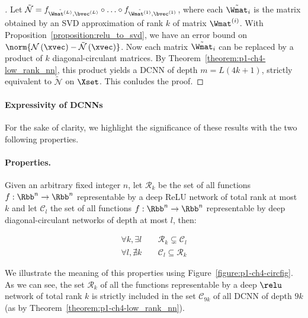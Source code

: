 \begin{proof}[]
  Let $\tilde{\mathcal{N}} = f_{\tilde{\Wmat^{(L)}},\bvec^{(L)}} \circ \ldots \circ f_{\tilde{\Wmat^{(1)}},\bvec^{(1)}}$, where each $\tilde{\Wmat}_{i}$ is the matrix obtained by an SVD approximation of rank $k$ of matrix $\Wmat^{(i)}$.
  With Proposition~\ref{proposition:relu_to_svd}, we have an error bound on $\norm{\mathcal{N} \left(\xvec\right) - \tilde{\mathcal{N}} \left(\xvec\right)}$.
  Now each matrix $\tilde{\Wmat}_{i}$ can be replaced by a product of $k$ diagonal-circulant matrices.
  By Theorem~\ref{theorem:p1-ch4-low_rank_nn}, this product yields a DCNN of depth $m = L(4k+1)$, strictly equivalent to $\tilde{\mathcal{N}}$ on $\Xset$.
  This conludes the proof.
\end{proof}



\paragraph{Expressivity of DCNNs}

For the sake of clarity, we highlight the significance of these results with the two following properties.

\paragraph{Properties.}
Given an arbitrary fixed integer $n$, let $\mathcal{R}_{k}$ be the set of all functions $f:\Rbb^{n} \rightarrow \Rbb^{n}$ representable by a deep ReLU network of total rank at most $k$ and let $\mathcal{C}_{l}$ the set of all functions $f:\Rbb^{n} \rightarrow \Rbb^{n}$ representable by deep diagonal-circulant networks of depth at most $l$, then:

\begin{align}
  \label{property:eq1} \forall k,\exists l \, &\quad \mathcal{R}_{k} \subsetneq \mathcal{C}_{l} \\
  \label{property:eq2} \forall l,\nexists k\, &\quad \mathcal{C}_{l} \subseteq \mathcal{R}_{k}
\end{align}

We illustrate the meaning of this properties using Figure~\ref{figure:p1-ch4-circfig}.
As we can see, the set $\mathcal R_{k}$ of all the functions representable by a deep $\relu$ network of total rank $k$ is strictly included in the set $\mathcal C_{9k}$ of all DCNN of depth $9k$ (as by Theorem~\ref{theorem:p1-ch4-low_rank_nn}).


